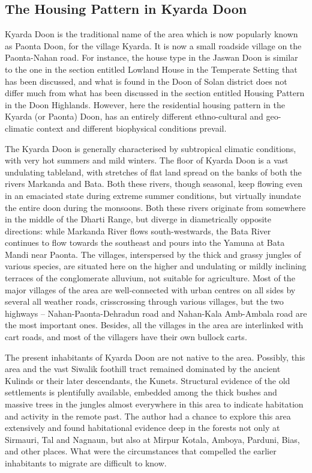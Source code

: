 \subsection*{The Housing Pattern in Kyarda Doon}

Kyarda Doon is the traditional name of the area which is now popularly known as Paonta Doon, for the village Kyarda. It is now a small roadside village on the Paonta-Nahan road. For instance, the house type in the Jaswan Doon is similar to the one in the section entitled Lowland House in the Temperate Setting that has been discussed, and what is found in the Doon of Solan district does not differ much from what has been discussed in the section entitled Housing Pattern in the Doon Highlands. However, here the residential housing pattern in the Kyarda (or Paonta) Doon, has an entirely different ethno-cultural and geo-climatic context and different biophysical conditions prevail.

\vskip 2pt

The Kyarda Doon is generally characterised by subtropical climatic conditions, with very hot summers and mild winters. The floor of Kyarda Doon is a vast undulating tableland, with stretches of flat land spread on the banks of both the rivers Markanda and Bata. Both these rivers, though seasonal, keep flowing even in an emaciated state during extreme summer conditions, but virtually inundate the entire doon during the monsoons. Both these rivers originate from somewhere in the middle of the Dharti Range, but diverge in diametrically opposite directions: while Markanda River flows south-westwards, the Bata River continues to flow towards the southeast and pours into the Yamuna at Bata Mandi near Paonta. The villages, interspersed by the thick and grassy jungles of various species, are situated here on the higher and undulating or mildly inclining terraces of the conglomerate alluvium, not suitable for agriculture. Most of the major villages of the area are well-connected with urban centres on all sides by several all weather roads, crisscrossing through various villages, but the two highways – Nahan-Paonta-Dehradun road and Nahan-Kala Amb-Ambala road are the most important ones. Besides, all the villages in the area are interlinked with cart roads, and most of the villagers have their own bullock carts.

\vskip 2pt

The present inhabitants of Kyarda Doon are not native to the area. Possibly, this area and the vast Siwalik foothill tract remained dominated by the ancient Kulinds or their later descendants, the Kunets. Structural evidence of the old settlements is plentifully available, embedded among the thick bushes and massive trees in the jungles almost everywhere in this area to indicate habitation and activity in the remote past. The author had a chance to explore this area extensively and found habitational evidence deep in the forests not only at Sirmauri, Tal and Nagnaun, but also at Mirpur Kotala, Amboya, Parduni, Bias, and other places. What were the circumstances that compelled the earlier inhabitants to migrate are difficult to know.

